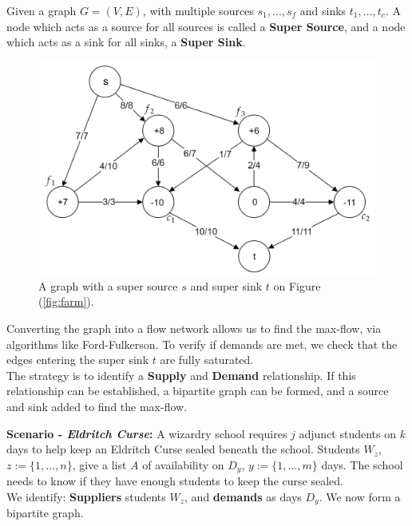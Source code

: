 \begin{Def}

    Given a graph $G=(V,E)$, with multiple sources $s_1,\dots,s_f$ and sinks $t_1,\dots,t_c$. A node 
    which acts as a source for all sources is called a \textbf{Super Source}, and a node which acts as a sink for all sinks, a \textbf{Super Sink}.
\end{Def}

\begin{figure}[h]
    \centering
    \includegraphics[width=.6\textwidth]{Sections/net/farmres.png}
    \caption{A graph with a super source $s$ and super sink $t$ on Figure (\ref{fig:farm}).}
\end{figure}

\vspace{-1em}
\noindent
Converting the graph into a flow network allows us to find the max-flow, via algorithms like Ford-Fulkerson. To verify
if demands are met, we check that the edges entering the super sink $t$ are fully saturated.\\

\noindent
The strategy is to identify a \textbf{Supply} and \textbf{Demand} relationship. If this relationship can be established, 
a bipartite graph can be formed, and a source and sink added to find the max-flow.

\newpage

\noindent
\textbf{Scenario - \textit{Eldritch Curse}:} A wizardry school requires $j$ adjunct students on 
$k$ days to help keep an Eldritch Curse sealed beneath the school. Students $W_z$, $z:=\{1,\dots,n\}$, give a list $A$ of availability on
$D_y$, $y:=\{1,\dots,m\}$ days. The school needs to know if they have enough students to keep the curse sealed.\\

\noindent
We identify: \textbf{Suppliers} students $W_z$, and \textbf{demands} as days $D_y$. We now form a bipartite graph.

